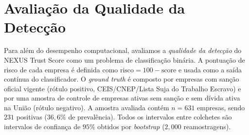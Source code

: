 %

\section{Avaliação da Qualidade da Detecção}
\label{sec:avaliacao}

Para além do desempenho computacional, avaliamos a \emph{qualidade da
detecção} do NEXUS Trust Score como um problema de classificação binária.
A pontuação de risco de cada empresa é definida como $\text{risco}=100-\text{score}$
e usada como a saída contínua do classificador. O \textit{ground truth} é
composto por empresas com sanção oficial vigente (rótulo positivo,
CEIS/CNEP/Lista Suja do Trabalho Escravo) e por uma amostra de controle de
empresas ativas sem sanção e sem dívida ativa na União (rótulo negativo).
A amostra avaliada contém $n=631$ empresas, sendo $231$ positivas
($36{,}6\%$ de prevalência). Todos os intervalos entre colchetes são
intervalos de confiança de $95\%$ obtidos por \textit{bootstrap}
($2{,}000$ reamostragens).

